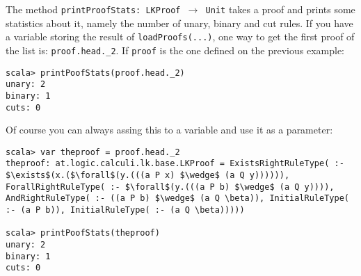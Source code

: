 \documentclass[a4paper,11pt]{article}
\begin{document}
The method \texttt{printProofStats: LKProof $\rightarrow$ Unit}
takes a proof and prints some statistics about it, namely the number
of unary, binary and cut rules. If you have a variable storing the result of 
\texttt{loadProofs(...)}, one way to get the first proof of the list is: 
\texttt{proof.head.\_2}. If \texttt{proof} is the one defined on the previous 
example:

\begin{lstlisting}
scala> printPoofStats(proof.head._2)
unary: 2
binary: 1
cuts: 0
\end{lstlisting}

Of course you can always assing this to a variable and use it as a parameter:

\begin{lstlisting}
scala> var theproof = proof.head._2
theproof: at.logic.calculi.lk.base.LKProof = ExistsRightRuleType( :- $\exists$(x.($\forall$(y.(((a P x) $\wedge$ (a Q y)))))), ForallRightRuleType( :- $\forall$(y.(((a P b) $\wedge$ (a Q y)))), AndRightRuleType( :- ((a P b) $\wedge$ (a Q \beta)), InitialRuleType( :- (a P b)), InitialRuleType( :- (a Q \beta)))))

scala> printPoofStats(theproof)
unary: 2
binary: 1
cuts: 0
\end{lstlisting}
\end{document}
